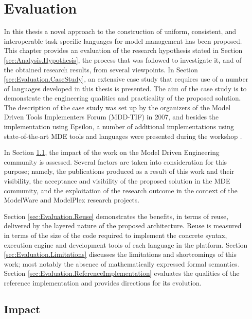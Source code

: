 \chapter{Evaluation}
\label{chp:Evaluation}

In this thesis a novel approach to the construction of uniform, consistent, and interoperable task-specific languages for model management has been proposed. This chapter provides an evaluation of the research hypothesis stated in Section \ref{sec:Analysis.Hypothesis}, the process that was followed to investigate it, and of the obtained research results, from several viewpoints. In Section \ref{sec:Evaluation.CaseStudy}, an extensive case study that requires use of a number of languages developed in this thesis is presented. The aim of the case study is to demonstrate the engineering qualities and practicality of the proposed solution. The description of the case study was set up by the organizers of the Model Driven Tools Implementers Forum (MDD-TIF) \cite{MDDTIF} in 2007, and besides the implementation using Epsilon, a number of additional implementations using state-of-the-art MDE tools and languages were presented during the workshop \cite{MDDTIF}.

In Section \ref{sec:Evaluation.Impact}, the impact of the work on the Model Driven Engineering community is assessed. Several factors are taken into consideration for this purpose; namely, the publications produced as a result of this work and their visibility, the acceptance and visibility of the proposed solution in the MDE community, and the exploitation of the research outcome in the context of the ModelWare and ModelPlex research projects.

Section \ref{sec:Evaluation.Reuse} demonstrates the benefits, in terms of reuse, delivered by the layered nature of the proposed architecture. Reuse is measured in terms of the size of the code required to implement the concrete syntax, execution engine and development tools of each language in the platform. Section \ref{sec:Evaluation.Limitations} discusses the limitations and shortcomings of this work; most notably the absence of mathematically expressed formal semantics. Section \ref{sec:Evaluation.ReferenceImplementation} evaluates the qualities of the reference implementation and provides directions for its evolution.



\section{Impact}
\label{sec:Evaluation.Impact}

